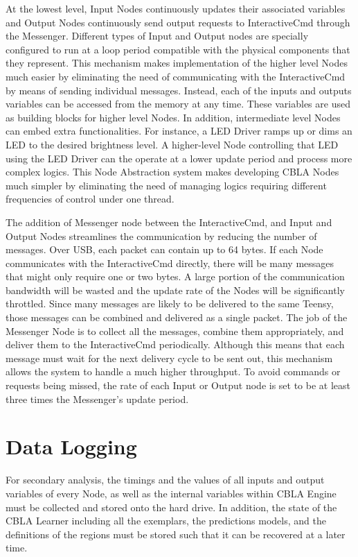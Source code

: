At the lowest level, Input Nodes continuously updates their associated variables and Output Nodes continuously send output requests to InteractiveCmd through the Messenger. Different types of Input and Output nodes are specially configured to run at a loop period compatible with the physical components that they represent. This mechanism makes implementation of the higher level Nodes much easier by eliminating the need of communicating with the InteractiveCmd by means of sending individual messages. Instead, each of the inputs and outputs variables can be accessed from the memory at any time. These variables are used as building blocks for higher level Nodes. In addition, intermediate level Nodes can embed extra functionalities. For instance, a LED Driver ramps up or dims an LED to the desired brightness level. A higher-level Node controlling that LED using the LED Driver can the operate at a lower update period and process more complex logics. This Node Abstraction system makes developing CBLA Nodes much simpler by eliminating the need of managing logics requiring different frequencies of control under one thread. 

The addition of Messenger node between the InteractiveCmd, and Input and Output Nodes streamlines the communication by reducing the number of messages. Over USB, each packet can contain up to 64 bytes. If each Node communicates with the InteractiveCmd directly, there will be many messages that might only require one or two bytes. A large portion of the communication bandwidth will be wasted and the update rate of the Nodes will be significantly throttled. Since many messages are likely to be delivered to the same Teensy, those messages can be combined and delivered as a single packet. The job of the Messenger Node is to collect all the messages, combine them appropriately, and deliver them to the InteractiveCmd periodically. Although this means that each message must wait for the next delivery cycle to be sent out, this mechanism allows the system to handle a much higher throughput. To avoid commands or requests being missed, the rate of each Input or Output node is set to be at least three times the Messenger's update period. 


\FloatBarrier
\section{Data Logging}

For secondary analysis, the timings and the values of all inputs and output variables of every Node, as well as the internal variables within CBLA Engine must be collected and stored onto the hard drive. In addition, the state of the CBLA Learner including all the exemplars, the predictions models, and the definitions of the regions must be stored such that it can be recovered at a later time. 

